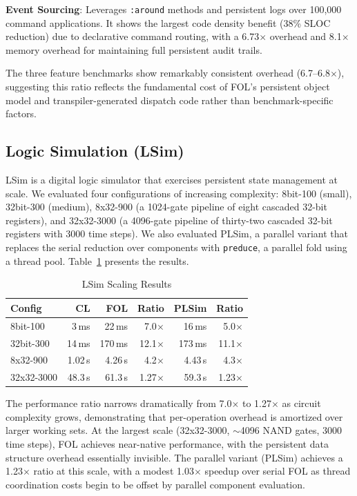 \documentclass[sigconf,nonacm,review]{acmart}
\begin{document}
\textbf{Event Sourcing}: Leverages \texttt{:around} methods and persistent logs over 100,000 command applications. It shows the largest code density benefit (38\% SLOC reduction) due to declarative command routing, with a 6.73$\times$ overhead and 8.1$\times$ memory overhead for maintaining full persistent audit trails.

The three feature benchmarks show remarkably consistent overhead (6.7--6.8$\times$), suggesting this ratio reflects the fundamental cost of FOL's persistent object model and transpiler-generated dispatch code rather than benchmark-specific factors.

\subsection{Logic Simulation (LSim)}

LSim is a digital logic simulator that exercises persistent state management at scale. We evaluated four configurations of increasing complexity: 8bit-100 (small), 32bit-300 (medium), 8x32-900 (a 1024-gate pipeline of eight cascaded 32-bit registers), and 32x32-3000 (a 4096-gate pipeline of thirty-two cascaded 32-bit registers with 3000 time steps). We also evaluated PLSim, a parallel variant that replaces the serial reduction over components with \texttt{preduce}, a parallel fold using a thread pool. Table~\ref{tab:lsim-perf} presents the results.

\begin{table}[htbp]
\small
\caption{LSim Scaling Results}
\label{tab:lsim-perf}
\begin{tabular}{lrrrrr}
\toprule
\textbf{Config} & \textbf{CL} & \textbf{FOL} & \textbf{Ratio} & \textbf{PLSim} & \textbf{Ratio} \\
\midrule
8bit-100 & 3\,ms & 22\,ms & 7.0$\times$ & 16\,ms & 5.0$\times$ \\
32bit-300 & 14\,ms & 170\,ms & 12.1$\times$ & 173\,ms & 11.1$\times$ \\
8x32-900 & 1.02\,s & 4.26\,s & 4.2$\times$ & 4.43\,s & 4.3$\times$ \\
32x32-3000 & 48.3\,s & 61.3\,s & 1.27$\times$ & 59.3\,s & 1.23$\times$ \\
\bottomrule
\end{tabular}
\end{table}

The performance ratio narrows dramatically from 7.0$\times$ to 1.27$\times$ as circuit complexity grows, demonstrating that per-operation overhead is amortized over larger working sets. At the largest scale (32x32-3000, $\sim$4096 NAND gates, 3000 time steps), FOL achieves near-native performance, with the persistent data structure overhead essentially invisible. The parallel variant (PLSim) achieves a 1.23$\times$ ratio at this scale, with a modest 1.03$\times$ speedup over serial FOL as thread coordination costs begin to be offset by parallel component evaluation.
\end{document}
